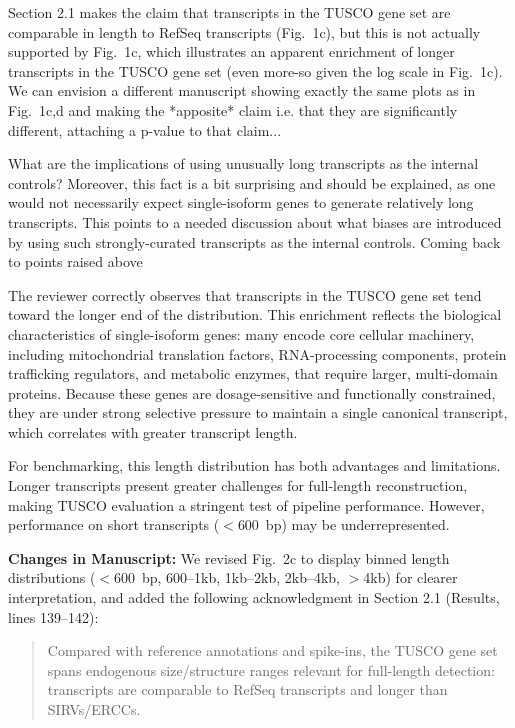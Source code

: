 \documentclass[11pt]{article}
\newcommand{\tuscoGeneSet}{TUSCO gene set}
\begin{document}
\begin{reviewercomment}
Section 2.1 makes the claim that transcripts in the TUSCO gene set are comparable in length to RefSeq transcripts (Fig.~1c), but this is not actually supported by Fig.~1c, which illustrates an apparent enrichment of longer transcripts in the TUSCO gene set (even more-so given the log scale in Fig.~1c). We can envision a different manuscript showing exactly the same plots as in Fig.~1c,d and making the *apposite* claim i.e. that they are significantly different, attaching a p-value to that claim... 

\vspace{0.2cm}
What are the implications of using unusually long transcripts as the internal controls? Moreover, this fact is a bit surprising and should be explained, as one would not necessarily expect single-isoform genes to generate relatively long transcripts. This points to a needed discussion about what biases are introduced by using such strongly-curated transcripts as the internal controls. Coming back to points raised above
\end{reviewercomment}

\begin{responseboxnew}
The reviewer correctly observes that transcripts in the TUSCO gene set tend toward the longer end of the distribution. This enrichment reflects the biological characteristics of single-isoform genes: many encode core cellular machinery, including mitochondrial translation factors, RNA-processing components, protein trafficking regulators, and metabolic enzymes, that require larger, multi-domain proteins. Because these genes are dosage-sensitive and functionally constrained, they are under strong selective pressure to maintain a single canonical transcript, which correlates with greater transcript length.

For benchmarking, this length distribution has both advantages and limitations. Longer transcripts present greater challenges for full-length reconstruction, making TUSCO evaluation a stringent test of pipeline performance. However, performance on short transcripts ($<$600~bp) may be underrepresented.

\vspace{0.3cm}
\textbf{Changes in Manuscript:} We revised Fig.~2c to display binned length distributions ($<$600~bp, 600--1kb, 1kb--2kb, 2kb--4kb, $>$4kb) for clearer interpretation, and added the following acknowledgment in Section 2.1 (Results, lines 139--142):
\begin{quote}
Compared with reference annotations and spike-ins, the \tuscoGeneSet{} spans endogenous size/structure ranges relevant for full-length detection: transcripts are comparable to RefSeq transcripts and longer than SIRVs/ERCCs.
\end{quote}
\end{responseboxnew}
\end{document}
